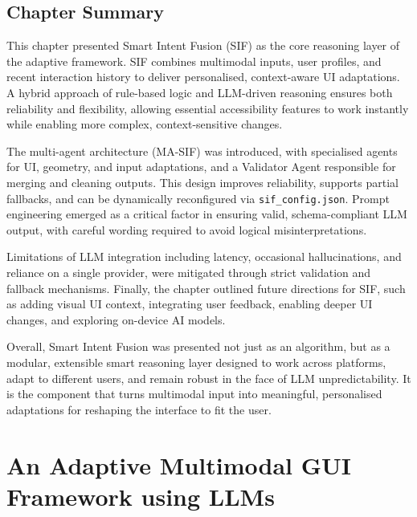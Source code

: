 \documentclass[openany]{book}
\begin{document}
\section{Chapter Summary}
This chapter presented Smart Intent Fusion (SIF) as the core reasoning layer of the adaptive framework. SIF combines multimodal inputs, user profiles, and recent interaction history to deliver personalised, context-aware UI adaptations. A hybrid approach of rule-based logic and LLM-driven reasoning ensures both reliability and flexibility, allowing essential accessibility features to work instantly while enabling more complex, context-sensitive changes.

The multi-agent architecture (MA-SIF) was introduced, with specialised agents for UI, geometry, and input adaptations, and a Validator Agent responsible for merging and cleaning outputs. This design improves reliability, supports partial fallbacks, and can be dynamically reconfigured via \texttt{sif\_config.json}. Prompt engineering emerged as a critical factor in ensuring valid, schema-compliant LLM output, with careful wording required to avoid logical misinterpretations.

Limitations of LLM integration including latency, occasional hallucinations, and reliance on a single provider, were mitigated through strict validation and fallback mechanisms. Finally, the chapter outlined future directions for SIF, such as adding visual UI context, integrating user feedback, enabling deeper UI changes, and exploring on-device AI models.

Overall, Smart Intent Fusion was presented not just as an algorithm, but as a modular, extensible smart reasoning layer designed to work across platforms, adapt to different users, and remain robust in the face of LLM unpredictability. It is the component that turns multimodal input into meaningful, personalised adaptations for reshaping the interface to fit the user.

\chapter{An Adaptive Multimodal GUI Framework using LLMs}
\end{document}
